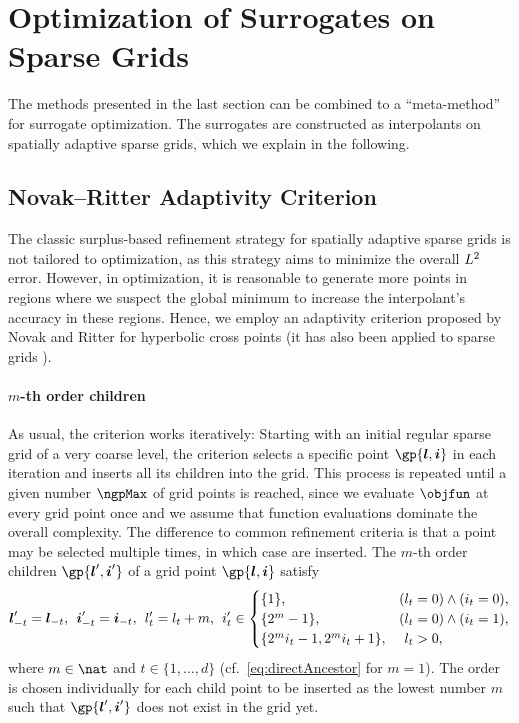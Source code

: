 \section{Optimization of Surrogates on Sparse Grids}
\label{sec:52method}

The methods presented in the last section can be combined to a
``meta-method'' for surrogate optimization.
The surrogates are constructed as interpolants on spatially adaptive
sparse grids, which we explain in the following.



\subsection{Novak--Ritter Adaptivity Criterion}
\label{sec:521novakRitter}

The classic surplus-based refinement strategy for
spatially adaptive sparse grids is not tailored to optimization,
as this strategy aims to minimize the overall $L^2$ error.
However, in optimization, it is reasonable to generate more
points in regions where we suspect the global minimum
to increase the interpolant's accuracy in these regions.
Hence, we employ an adaptivity criterion proposed by
Novak and Ritter \cite{Novak96Global} for hyperbolic cross points
(it has also been applied to sparse grids
).

\paragraph{$m$-th order children}

As usual, the criterion works iteratively:
Starting with an initial regular sparse grid of a very coarse level,
the criterion selects a specific point $\gp{\*l,\*i}$ in each iteration
and inserts all its children into the grid.
This process is repeated until a given number $\ngpMax$ of grid points is
reached,
since we evaluate $\objfun$ at every grid point once and we assume that
function evaluations dominate the overall complexity.
The difference to common refinement criteria is that
a point may be selected multiple times, in which case
 are inserted.
The $m$-th order children $\gp{\*l',\*i'}$ of a grid point $\gp{\*l,\*i}$
satisfy
\begin{equation}
  \label{eq:indirectChild}
  {\boldsymbol{l}}'_{-t} = {\boldsymbol{l}}_{-t},\;\,
  {\boldsymbol{i}}'_{-t} = {\boldsymbol{i}}_{-t},\;\,
  l'_t = l_t + m,\;\,
  i'_t \in
  \begin{cases}
    \{1\},&(l_t = 0) \land (i_t = 0),\\
    \{2^m - 1\},&(l_t = 0) \land (i_t = 1),\\
    \{2^m i_t - 1, 2^m i_t + 1\},&\hphantom{(}l_t > 0,
  \end{cases}
\end{equation}
where $m \in \nat$ and $t \in \{1, \dotsc, d\}$
(cf.\ \eqref{eq:directAncestor} for $m = 1$).
The order is chosen individually for each child point to be inserted
as the lowest number $m$ such that $\gp{\*l',\*i'}$ does not exist
in the grid yet.

